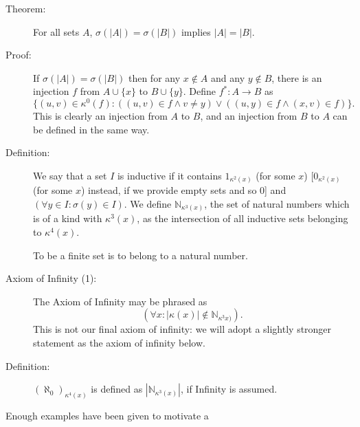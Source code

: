 \documentclass[12pt]{article}
\begin{document}
\begin{description}
\item[Theorem:]  For all sets $A$, $\sigma(|A|) = \sigma(|B|)$ implies $|A|=|B|$.

\item[Proof:]  If $\sigma(|A|) = \sigma(|B|)$ then for any $x \not\in A$ and any $y \not\in B$, there is an injection $f$ from $A \cup \{x\}$ to $B\cup \{y\}$.  Define $f^*:A \rightarrow B$ as $$\{(u,v)\in\kappa^0(f):((u,v) \in f \wedge v \neq y) \vee ((u,y) \in f \wedge (x,v) \in f)\}.$$  This is clearly an injection from $A$ to $B$, and an injection from $B$ to $A$ can be defined in the same way.

\item[Definition:]  We say that a set $I$ is inductive if it contains $1_{\kappa^2(x)}$ (for some $x$) [$0_{\kappa^2(x)}$ (for some $x$) instead, if we provide empty sets and so 0] and $(\forall y \in I:\sigma(y) \in I)$.  We define ${\mathbb N}_{\kappa^3(x)}$, the set of natural numbers which is of a kind with $\kappa^3(x)$, as the intersection of all inductive sets belonging to $\kappa^4(x)$.

To be a finite set is to belong to a natural number.

\item[Axiom of Infinity (1):]  The Axiom of Infinity may be phrased as $$(\forall x:|\kappa(x)| \not\in {\mathbb N}_{\kappa^3x)}).$$  This is not our final axiom of infinity:  we will adopt a slightly stronger statement as the axiom of infinity below.


\item[Definition:]  $(\aleph_0)_{\kappa^4(x)}$ is defined as $|{\mathbb N}_{\kappa^3(x)}| $, if Infinity is assumed.



\end{description}


Enough examples have been given to motivate a 
\end{document}
